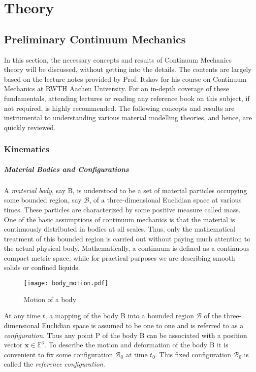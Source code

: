 \chapter{Theory}%
\label{chapter:two}

\section{Preliminary Continuum Mechanics}
In this section, the necessary concepts and results of Continuum Mechanics theory will be discussed, without getting into the details. The contents are largely based on the lecture notes provided by Prof. Itskov for his course on Continuum Mechanics\cite{ContinuumMechanics2020} at RWTH Aachen University. For an in-depth coverage of these fundamentals, attending lectures or reading any reference book on this subject, if not required, is highly recommended. The following concepts and results are instrumental to understanding various material modelling theories, and hence, are quickly reviewed.

\subsection{Kinematics}

\paragraph*{Material Bodies and Configurations}%
A \emph{material body}, say B, is understood to be a set of material particles occupying some bounded region, say \(\mathcal{B}\), of a three-dimensional Euclidian space at various times. These particles are characterized by some positive measure called mass. One of the basic assumptions of continuum mechanics is that the material is continuously distributed in bodies at all scales. Thus, only the mathematical treatment of this bounded region is carried out without paying much attention to the actual physical body. Mathematically, a continuum is defined as a continuous compact metric space, while for practical purposes we are describing smooth solids or confined liquids.

\begin{figure}[htpb]
    \centering
    \texttt{[image: body\_motion.pdf]}
    \caption{Motion of a body}%
    \label{fig:body_motion}
\end{figure}

At any time \(t\), a mapping of the body B into a bounded region \(\mathcal{B}\) of the three-dimensional Euclidian space is assumed to be one to one and is referred to as a \emph{configuration}. Thus any point P of the body B can be associated with a position vector \(\bm{x} \in \mathbb{E}^{3}\). To describe the motion and deformation of the body B it is convenient to fix some configuration \(\mathcal{B}_{0}\) at time \(t_0\). This fixed configuration \(\mathcal{B}_{0}\) is called the \emph{reference configuration}. 

